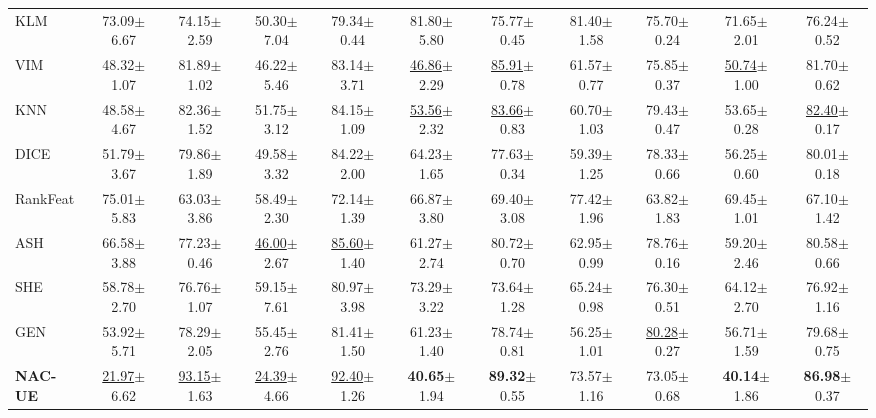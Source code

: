\documentclass{article} \usepackage{iclr2024_conference,times}
\begin{document}
\begin{table*}[h]
{\begin{tabular}{l cc cc cc cc cc}
			KLM & 73.09{\tiny$\pm$6.67} &  74.15{\tiny$\pm$2.59} &  50.30{\tiny$\pm$7.04} &  79.34{\tiny$\pm$0.44} &  81.80{\tiny$\pm$5.80} &  75.77{\tiny$\pm$0.45} &  81.40{\tiny$\pm$1.58} &  75.70{\tiny$\pm$0.24} &  71.65{\tiny$\pm$2.01} &  76.24{\tiny$\pm$0.52 }\\ 
			VIM & 48.32{\tiny$\pm$1.07} &  81.89{\tiny$\pm$1.02} &  46.22{\tiny$\pm$5.46} &  83.14{\tiny$\pm$3.71} &  \underline{46.86}{\tiny$\pm$2.29} &  \underline{85.91}{\tiny$\pm$0.78} &  61.57{\tiny$\pm$0.77} &  75.85{\tiny$\pm$0.37} &  \underline{50.74}{\tiny$\pm$1.00} &  81.70{\tiny$\pm$0.62 }\\ 
			KNN & 48.58{\tiny$\pm$4.67} &  82.36{\tiny$\pm$1.52} &  51.75{\tiny$\pm$3.12} &  84.15{\tiny$\pm$1.09} &  \underline{53.56}{\tiny$\pm$2.32} &  \underline{83.66}{\tiny$\pm$0.83} &  60.70{\tiny$\pm$1.03} &  79.43{\tiny$\pm$0.47} &  53.65{\tiny$\pm$0.28} &  \underline{82.40}{\tiny$\pm$0.17 }\\ 
			DICE & 51.79{\tiny$\pm$3.67} &  79.86{\tiny$\pm$1.89} &  49.58{\tiny$\pm$3.32} &  84.22{\tiny$\pm$2.00} &  64.23{\tiny$\pm$1.65} &  77.63{\tiny$\pm$0.34} &  59.39{\tiny$\pm$1.25} &  78.33{\tiny$\pm$0.66} &  56.25{\tiny$\pm$0.60} &  80.01{\tiny$\pm$0.18 }\\ 
			RankFeat & 75.01{\tiny$\pm$5.83} &  63.03{\tiny$\pm$3.86} &  58.49{\tiny$\pm$2.30} &  72.14{\tiny$\pm$1.39} &  66.87{\tiny$\pm$3.80} &  69.40{\tiny$\pm$3.08} &  77.42{\tiny$\pm$1.96} &  63.82{\tiny$\pm$1.83} &  69.45{\tiny$\pm$1.01} &  67.10{\tiny$\pm$1.42 }\\ 
			ASH & 66.58{\tiny$\pm$3.88} &  77.23{\tiny$\pm$0.46} &  \underline{46.00}{\tiny$\pm$2.67} &  \underline{85.60}{\tiny$\pm$1.40} &  61.27{\tiny$\pm$2.74} &  80.72{\tiny$\pm$0.70} &  62.95{\tiny$\pm$0.99} &  78.76{\tiny$\pm$0.16} &  59.20{\tiny$\pm$2.46} &  80.58{\tiny$\pm$0.66 }\\ 
			SHE & 58.78{\tiny$\pm$2.70} &  76.76{\tiny$\pm$1.07} &  59.15{\tiny$\pm$7.61} &  80.97{\tiny$\pm$3.98} &  73.29{\tiny$\pm$3.22} &  73.64{\tiny$\pm$1.28} &  65.24{\tiny$\pm$0.98} &  76.30{\tiny$\pm$0.51} &  64.12{\tiny$\pm$2.70} &  76.92{\tiny$\pm$1.16 }\\ 
			GEN & 53.92{\tiny$\pm$5.71} &  78.29{\tiny$\pm$2.05} &  55.45{\tiny$\pm$2.76} &  81.41{\tiny$\pm$1.50} &  61.23{\tiny$\pm$1.40} &  78.74{\tiny$\pm$0.81} &  56.25{\tiny$\pm$1.01} &  \underline{80.28}{\tiny$\pm$0.27} &  56.71{\tiny$\pm$1.59} &  79.68{\tiny$\pm$0.75 }\\ 
			\rowcolor{LightGray}
			\textbf{NAC-UE} & \underline{21.97}{\tiny$\pm$6.62 } &  \underline{93.15}{\tiny$\pm$1.63 } &  \underline{24.39}{\tiny$\pm$4.66 } &  \underline{92.40}{\tiny$\pm$1.26 } &  \textbf{40.65}{\tiny$\pm$1.94 } &  \textbf{89.32}{\tiny$\pm$0.55 } &  73.57{\tiny$\pm$1.16  } &  73.05{\tiny$\pm$0.68 } &  \textbf{40.14}{\tiny$\pm$1.86 } &  \textbf{86.98}{\tiny$\pm$0.37 }\\ 
			

\end{tabular}}
\end{table*}
\end{document}
